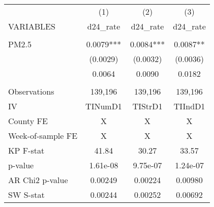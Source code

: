 \begin{tabular}{lccc} \hline
 & (1) & (2) & (3) \\
VARIABLES & d24\_rate & d24\_rate & d24\_rate \\ \hline
 &  &  &  \\
PM2.5 & 0.0079*** & 0.0084*** & 0.0087** \\
 & (0.0029) & (0.0032) & (0.0036) \\
 & 0.0064 & 0.0090 & 0.0182 \\
 &  &  &  \\
Observations & 139,196 & 139,196 & 139,196 \\
IV & TINumD1 & TIStrD1 & TIIndD1 \\
County FE & X & X & X \\
Week-of-sample FE & X & X & X \\
KP F-stat & 41.84 & 30.27 & 33.57 \\
p-value & 1.61e-08 & 9.75e-07 & 1.24e-07 \\
AR Chi2 p-value & 0.00249 & 0.00224 & 0.00980 \\
 SW S-stat & 0.00244 & 0.00252 & 0.00692 \\ \hline
\end{tabular}

